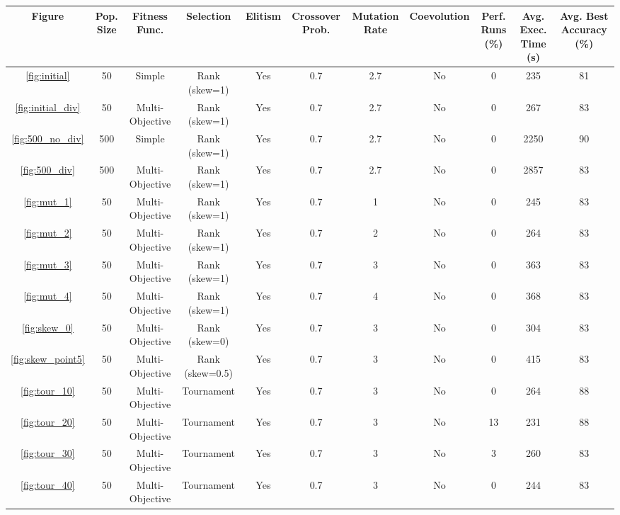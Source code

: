 \documentclass[ %
                    author={Alexander Dalton},
                supervisor={Prof. Seth Bullock},
                    degree={MEng},
                     title={Exploring Evolutionary Hardware:},
                  subtitle={Evolved Binary Arithmetic Circuits and Dynamic Problems},
                      type={research},
                      year={2018} ]{dissertation}
\begin{document}
\begin{landscape}
	\begin{longtable}{cccccccc|ccc}
		\toprule
		Figure& {Pop. Size} & {Fitness Func.} & {Selection}
			  &{Elitism} & \parbox{0.06\linewidth}{\centering Crossover Prob.} 
			  &\parbox{0.06\linewidth}{\centering Mutation Rate} & Coevolution
		&\parbox{0.06\linewidth}{\centering Perf. Runs (\%)} & \parbox{0.06\linewidth}{\centering Avg. Exec. Time (s)}
		&\parbox{0.06\linewidth}{\centering Avg. Best Accuracy (\%)}\\
		\midrule
		\ref{fig:initial} & 50 & Simple & Rank (skew=1) & Yes & 0.7 & 2.7 & No & 0 & 235 & 81\\
		\ref{fig:initial_div} & 50 & Multi-Objective\footnotemark[2] & Rank (skew=1) & Yes & 0.7 & 2.7 & No & 0 & 267 & 83\\
		\ref{fig:500_no_div} & 500 & Simple & Rank (skew=1) & Yes & 0.7 & 2.7 & No & 0 & 2250 & 90\\
		\ref{fig:500_div} & 500 & Multi-Objective\footnotemark[2] & Rank (skew=1) & Yes & 0.7 & 2.7 & No & 0 & 2857 & 83\\
		\ref{fig:mut_1} & 50 & Multi-Objective\footnotemark[2] & Rank (skew=1) & Yes & 0.7 & 1 & No & 0 & 245 & 83 \\
		\ref{fig:mut_2} & 50 & Multi-Objective\footnotemark[2] & Rank (skew=1) & Yes & 0.7 & 2 & No & 0 & 264 & 83 \\
		\ref{fig:mut_3} & 50 & Multi-Objective\footnotemark[2] & Rank (skew=1) & Yes & 0.7 & 3 & No & 0 & 363 & 83 \\
		\ref{fig:mut_4} & 50 & Multi-Objective\footnotemark[2] & Rank (skew=1) & Yes & 0.7 & 4 & No & 0 & 368 & 83 \\
		\ref{fig:skew_0} & 50 & Multi-Objective\footnotemark[2] & Rank (skew=0) & Yes & 0.7 & 3 & No & 0 & 304 & 83 \\
		\ref{fig:skew_point5} & 50 & Multi-Objective\footnotemark[2] & Rank (skew=0.5) & Yes & 0.7 & 3 & No & 0 & 415 & 83 \\
		\ref{fig:tour_10} & 50 & Multi-Objective\footnotemark[2] & Tournament\footnotemark[4] & Yes & 0.7 & 3 & No & 0 & 264 & 88 \\
		\ref{fig:tour_20} & 50 & Multi-Objective\footnotemark[2] & Tournament\footnotemark[5] & Yes & 0.7 & 3 & No & 13 & 231 & 88 \\
		\ref{fig:tour_30} & 50 & Multi-Objective\footnotemark[2] & Tournament\footnotemark[6] & Yes & 0.7 & 3 & No & 3 & 260 & 83 \\
		\ref{fig:tour_40} & 50 & Multi-Objective\footnotemark[2] & Tournament\footnotemark[7] & Yes & 0.7 & 3 & No & 0 & 244 & 83 \\

\end{longtable}
\end{landscape}
\end{document}
